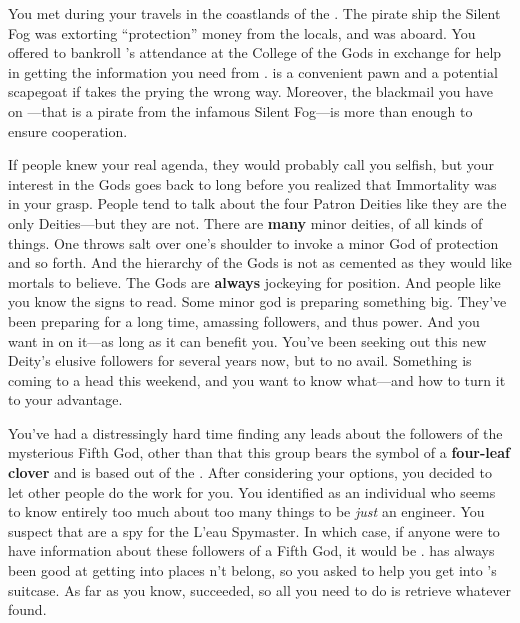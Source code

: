 \documentclass[char]{GL2020}
\begin{document}
You met \cPirateChild{} during your travels in the coastlands of the \pFarm{}. The pirate ship the Silent Fog was extorting ``protection'' money from the locals, and \cPirateChild{}  was aboard. You offered to bankroll \cPirateChild{}'s attendance at the College of the Gods in exchange for \cPirateChild{\their} help in getting the information you need from \cDisney{}. \cPirateChild{} is a convenient pawn and a potential scapegoat if \cDisney{} takes the prying the wrong way. Moreover, the blackmail you have on \cPirateChild{}---that \cPirateChild{\they} is a pirate from the infamous Silent Fog---is more than enough to ensure \cPirateChild{\their} cooperation.

If people knew your real agenda, they would probably call you selfish, but your interest in the Gods goes back to long before you realized that Immortality was in your grasp. People tend to talk about the four Patron Deities like they are the only Deities---but they are not. There are \textbf{many} minor deities, of all kinds of things. One throws salt over one’s shoulder to invoke a minor God of protection and so forth. And the hierarchy of the Gods is not as cemented as they would like mortals to believe. The Gods are \textbf{always} jockeying for position. And people like you know the signs to read. Some minor god is preparing something big. They've been preparing for a long time, amassing followers, and thus power. And you want in on it---as long as it can benefit you. You’ve been seeking out this new Deity's elusive followers for several years now, but to no avail. Something is coming to a head this weekend, and you want to know what---and how to turn it to your advantage.

You've had a distressingly hard time finding any leads about the followers of the mysterious Fifth God, other than that this group bears the symbol of a \textbf{four-leaf clover} and is based out of the \pShippies{}. After considering your options, you decided to let other people do the work for you. You identified \cBunker{\full} as an individual who seems to know entirely too much about too many things to be \emph{just} an engineer. You suspect that \cBunker{\they} are a spy for the L'eau Spymaster. In which case, if anyone were to have information about these followers of a Fifth God, it would be \cBunker{}. \cDisney{} has always been good at getting into places \cDisney{\they} \cDisney{\does}n’t belong, so you asked \cDisney{\them} to help you get into \cBunker{}’s suitcase. As far as you know, \cDisney{\they} succeeded, so all you need to do is retrieve whatever \cDisney{\they} found.
\end{document}
